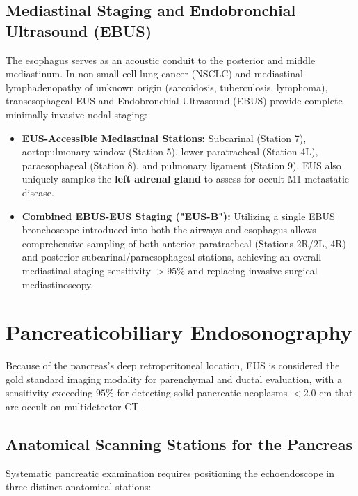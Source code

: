 \documentclass[11pt,a4paper]{article}
\begin{document}
\subsection{Mediastinal Staging and Endobronchial Ultrasound (EBUS)}
The esophagus serves as an acoustic conduit to the posterior and middle mediastinum. In non-small cell lung cancer (NSCLC) and mediastinal lymphadenopathy of unknown origin (sarcoidosis, tuberculosis, lymphoma), transesophageal EUS and Endobronchial Ultrasound (EBUS) provide complete minimally invasive nodal staging:
\begin{itemize}[leftmargin=2em]
    \item \textbf{EUS-Accessible Mediastinal Stations:} Subcarinal (Station 7), aortopulmonary window (Station 5), lower paratracheal (Station 4L), paraesophageal (Station 8), and pulmonary ligament (Station 9). EUS also uniquely samples the \textbf{left adrenal gland} to assess for occult M1 metastatic disease.
    \item \textbf{Combined EBUS-EUS Staging ("EUS-B"):} Utilizing a single EBUS bronchoscope introduced into both the airways and esophagus allows comprehensive sampling of both anterior paratracheal (Stations 2R/2L, 4R) and posterior subcarinal/paraesophageal stations, achieving an overall mediastinal staging sensitivity $> 95\%$ and replacing invasive surgical mediastinoscopy.
\end{itemize}

\section{Pancreaticobiliary Endosonography}
Because of the pancreas's deep retroperitoneal location, EUS is considered the gold standard imaging modality for parenchymal and ductal evaluation, with a sensitivity exceeding $95\%$ for detecting solid pancreatic neoplasms $< 2.0\text{ cm}$ that are occult on multidetector CT.

\subsection{Anatomical Scanning Stations for the Pancreas}
Systematic pancreatic examination requires positioning the echoendoscope in three distinct anatomical stations:
\end{document}

